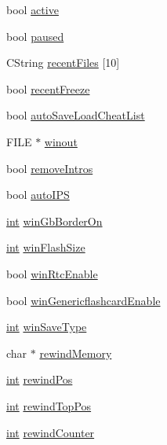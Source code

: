 \begin{DoxyCompactItemize}
bool \mbox{\hyperlink{class_v_b_a_ad3d55365d59a78eb24711c594eeb3b2b}{active}}
\item 
bool \mbox{\hyperlink{class_v_b_a_af7447bf3bf3f93948d2757e4cb223cfc}{paused}}
\item 
C\+String \mbox{\hyperlink{class_v_b_a_ab5efdeee24caf6cec163a3f51b50bf64}{recent\+Files}} \mbox{[}10\mbox{]}
\item 
bool \mbox{\hyperlink{class_v_b_a_a673f86057f7d022a426a1c1c3d6de36f}{recent\+Freeze}}
\item 
bool \mbox{\hyperlink{class_v_b_a_a234d3693fb47b5ca956545eb7f9671fb}{auto\+Save\+Load\+Cheat\+List}}
\item 
F\+I\+LE $\ast$ \mbox{\hyperlink{class_v_b_a_a62dbeb6d37279fa4d58f644af8b12d88}{winout}}
\item 
bool \mbox{\hyperlink{class_v_b_a_a6554de6c629baaf1567d4c3ed9f99e95}{remove\+Intros}}
\item 
bool \mbox{\hyperlink{class_v_b_a_a7655aea2f21bde8159a666f977c30975}{auto\+I\+PS}}
\item 
\mbox{\hyperlink{_util_8cpp_a0ef32aa8672df19503a49fab2d0c8071}{int}} \mbox{\hyperlink{class_v_b_a_afacb46f54fb546d8d97055dc535b074e}{win\+Gb\+Border\+On}}
\item 
\mbox{\hyperlink{_util_8cpp_a0ef32aa8672df19503a49fab2d0c8071}{int}} \mbox{\hyperlink{class_v_b_a_a5c99844bc4d1e5556434afaa75ae91e5}{win\+Flash\+Size}}
\item 
bool \mbox{\hyperlink{class_v_b_a_ae289fc4c9e951e0844900c522c151170}{win\+Rtc\+Enable}}
\item 
bool \mbox{\hyperlink{class_v_b_a_ac51ec97cd7b489be24edc77f346e5de7}{win\+Genericflashcard\+Enable}}
\item 
\mbox{\hyperlink{_util_8cpp_a0ef32aa8672df19503a49fab2d0c8071}{int}} \mbox{\hyperlink{class_v_b_a_a70060f88010280739406c87ef66d036a}{win\+Save\+Type}}
\item 
char $\ast$ \mbox{\hyperlink{class_v_b_a_ad2f4e21586cc185a1e6525080532471a}{rewind\+Memory}}
\item 
\mbox{\hyperlink{_util_8cpp_a0ef32aa8672df19503a49fab2d0c8071}{int}} \mbox{\hyperlink{class_v_b_a_a5d8ea18c98b5188813210a84819da5e8}{rewind\+Pos}}
\item 
\mbox{\hyperlink{_util_8cpp_a0ef32aa8672df19503a49fab2d0c8071}{int}} \mbox{\hyperlink{class_v_b_a_aa83e33c3d4bb203a5d223a0906a977d8}{rewind\+Top\+Pos}}
\item 
\mbox{\hyperlink{_util_8cpp_a0ef32aa8672df19503a49fab2d0c8071}{int}} \mbox{\hyperlink{class_v_b_a_a63a3cf03d4213b2596b59226134b0d5b}{rewind\+Counter}}

\end{DoxyCompactItemize}
